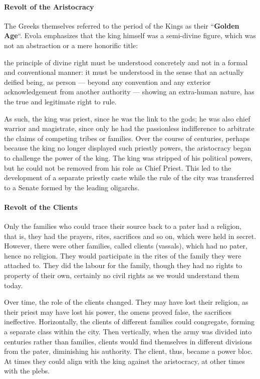 \paragraph{Revolt of the Aristocracy}
The Greeks themselves referred to the period of the Kings as their ``\textbf{Golden Age}``. Evola emphasizes that the king himself was a semi-divine figure, which was not an abstraction or a mere honorific title:

\begin{quotex}
the principle of divine right must be understood concretely and not in a formal and conventional manner: it must be understood in the sense that an actually deified being, as person — beyond any convention and any exterior acknowledgement from another authority — showing an extra-human nature, has the true and legitimate right to rule.

\end{quotex}
As such, the king was priest, since he was the link to the gods; he was also chief warrior and magistrate, since only he had the passionless indifference to arbitrate the claims of competing tribes or families. Over the course of centuries, perhaps because the king no longer displayed such priestly powers, the aristocracy began to challenge the power of the king. The king was stripped of his political powers, but he could not be removed from his role as Chief Priest. This led to the development of a separate priestly caste while the rule of the city was transferred to a Senate formed by the leading oligarchs.

\paragraph{Revolt of the Clients}
Only the families who could trace their source back to a pater had a religion, that is, they had the prayers, rites, sacrifices and so on, which were held in secret. However, there were other families, called clients (vassals), which had no pater, hence no religion. They would participate in the rites of the family they were attached to. They did the labour for the family, though they had no rights to property of their own, certainly no civil rights as we would understand them today.

Over time, the role of the clients changed. They may have lost their religion, as their priest may have lost his power, the omens proved false, the sacrifices ineffective. Horizontally, the clients of different families could congregate, forming a separate class within the city. Then vertically, when the army was divided into centuries rather than families, clients would find themselves in different divisions from the pater, diminishing his authority. The client, thus, became a power bloc. At times they could align with the king against the aristocracy, at other times with the plebs.

